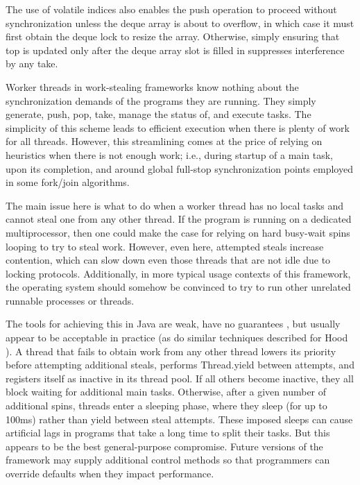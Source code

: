 The use of volatile indices also enables the push operation to proceed
without synchronization unless the deque array is about to overflow,
in which case it must first obtain the deque lock to resize the
array. Otherwise, simply ensuring that top is updated only after the
deque array slot is filled in suppresses interference by any take.


Worker threads in work-stealing frameworks know nothing about the
synchronization demands of the programs they are running. They simply
generate, push, pop, take, manage the status of, and execute
tasks. The simplicity of this scheme leads to efficient execution when
there is plenty of work for all threads. However, this streamlining
comes at the price of relying on heuristics when there is not enough
work; i.e., during startup of a main task, upon its completion, and
around global full-stop synchronization points employed in some
fork/join algorithms.

The main issue here is what to do when a worker thread has no local
tasks and cannot steal one from any other thread. If the program is
running on a dedicated multiprocessor, then one could make the case
for relying on hard busy-wait spins looping to try to steal
work. However, even here, attempted steals increase contention, which
can slow down even those threads that are not idle due to locking
protocols.  Additionally, in more typical usage contexts of this
framework, the operating system should somehow be convinced to try to
run other unrelated runnable processes or threads.

The tools for achieving this in Java are weak, have no guarantees
\cite{Goetz2006}, but usually appear to be acceptable in practice (as
do similar techniques described for Hood \cite{Blumofe1998}). A thread
that fails to obtain work from any other thread lowers its priority
before attempting additional steals, performs Thread.yield between
attempts, and registers itself as inactive in its thread pool. If all
others become inactive, they all block waiting for additional main
tasks. Otherwise, after a given number of additional spins, threads
enter a sleeping phase, where they sleep (for up to 100ms) rather than
yield between steal attempts. These imposed sleeps can cause
artificial lags in programs that take a long time to split their
tasks. But this appears to be the best general-purpose
compromise. Future versions of the framework may supply additional
control methods so that programmers can override defaults when they
impact performance.


